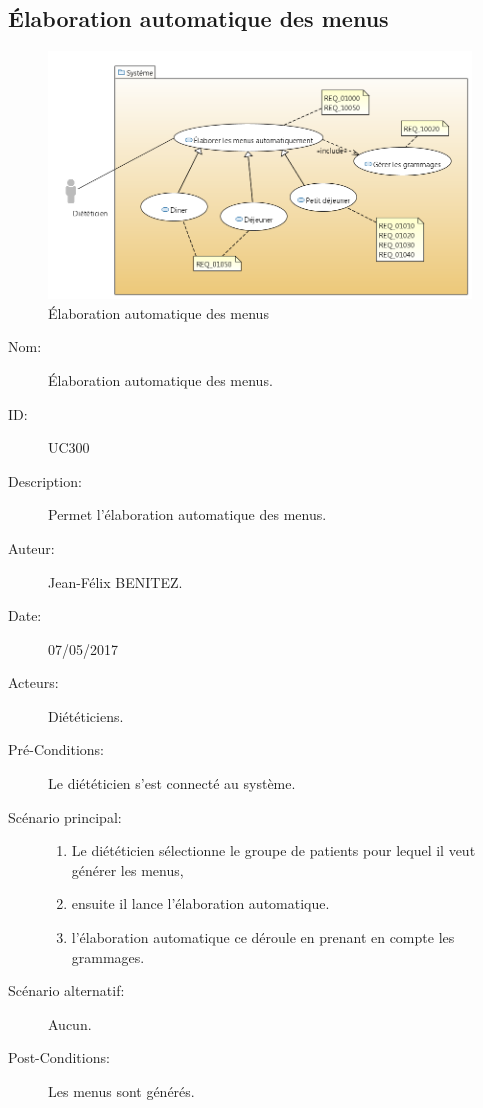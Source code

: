 \subsection{Élaboration automatique des menus}
\begin{figure}[H]
\label{MenuGen}
  \centering
      \includegraphics[width=1.00\textwidth]{../../CasDUtilisations/MenuGen/MenuGen.png} %
\caption{Élaboration automatique des menus}
\end{figure}

\begin{description}
\item[Nom:] Élaboration automatique des menus.
\item[ID:] UC300
\item[Description:] Permet l'élaboration automatique des menus.
\item[Auteur:] Jean-Félix BENITEZ.
\item[Date:] 07/05/2017
\item[Acteurs:] Diététiciens.
\item[Pré-Conditions:] Le diététicien s'est connecté au système.
\item[Scénario principal:]
  \begin{enumerate}
  \item Le diététicien sélectionne le groupe de patients pour lequel il veut générer les menus,
  \item ensuite il lance l'élaboration automatique.
  \item l'élaboration automatique ce déroule en prenant en compte les grammages.
  \end{enumerate}
\item[Scénario alternatif:] Aucun.
\item[Post-Conditions:] Les menus sont générés.
\end{description}

